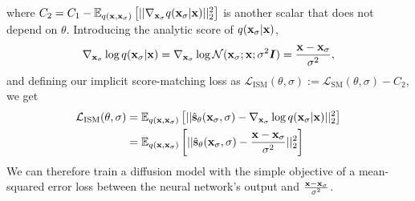 where $C_2 = C_1 - \mathbb{E}_{q({\mathbf{x}}, {\mathbf{x}}_\sigma)}\left[ || \nabla_{{\mathbf{x}}_\sigma} q({\mathbf{x}}_\sigma|{\mathbf{x}}) ||_2^2 \right]$ is another scalar that does not depend on $\theta$. Introducing the analytic score of $q({\mathbf{x}}_\sigma|{\mathbf{x}})$,
\begin{equation}
    \nabla_{{\mathbf{x}}_\sigma} \log q({\mathbf{x}}_\sigma|{\mathbf{x}}) = \nabla_{{\mathbf{x}}_\sigma} \log {\mathcal{N}}({\mathbf{x}}_\sigma; {\mathbf{x}}; \sigma^2{\bm{I}}) = \frac{{\mathbf{x}}-{\mathbf{x}}_\sigma}{\sigma^2},
\end{equation}
and defining our implicit score-matching loss as $\mathcal{L}_\text{ISM}(\theta, \sigma) := \mathcal{L}_\text{SM}(\theta, \sigma) - C_2$, we get
\begin{align} \label{eq:ism-loss}
    \mathcal{L}_\text{ISM}(\theta, \sigma) &= \mathbb{E}_{q({\mathbf{x}}, {\mathbf{x}}_\sigma)} \left[ 
    || \hat{{\mathbf{s}}}_\theta({\mathbf{x}}_\sigma, \sigma) - \nabla_{{\mathbf{x}}_\sigma} \log q({\mathbf{x}}_\sigma|{\mathbf{x}}) ||_2^2 \right] \\
    &= \mathbb{E}_{q({\mathbf{x}}, {\mathbf{x}}_\sigma)} \left[  \label{eq:ism-loss-ve}
    || \hat{{\mathbf{s}}}_\theta({\mathbf{x}}_\sigma, \sigma) - \frac{{\mathbf{x}}-{\mathbf{x}}_\sigma}{\sigma^2} ||_2^2 \right]
\end{align}
We can therefore train a diffusion model with the simple objective of a mean-squared error loss between the neural network's output and $\frac{{\mathbf{x}}-{\mathbf{x}}_\sigma}{\sigma^2}$.


